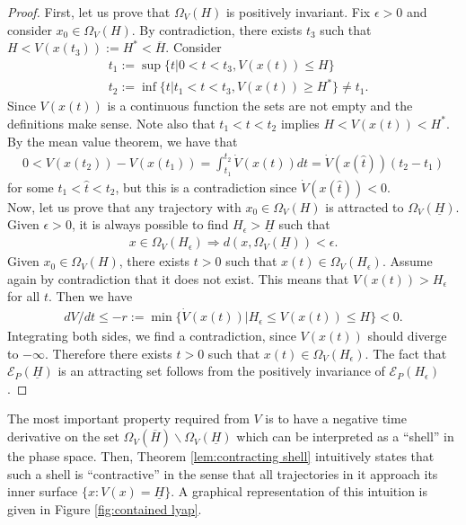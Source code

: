 \documentclass[letterpaper,10pt,twocolumn,journal,final]{IEEEtran}
\newcommand{\eps}{\epsilon}
\newcommand{\ellips}{\mathcal{E}}
\begin{document}
\begin{proof}
	First, let us prove that $\Omega_V(H)$ is positively invariant.
	Fix $\eps>0$ and consider $x_0\in \Omega_V(H)$.
	By contradiction, there exists $t_3$ such that 
	$H<V(x(t_3)):=H^*<\overline H$.
	Consider
	\begin{align}
		& t_1:=\sup\{t|0<t<t_3, V(x(t))\leq H \}\\
		& t_2:=\inf\{t|t_1<t<t_3, V(x(t))\geq H^* \}\neq t_1.
	\end{align}
	Since $V(x(t))$ is a continuous function the sets are not empty and the definitions make sense. Note also that $t_1 < t < t_2$ implies
	$H<V(x(t))<H^*$.
	By the mean value theorem, we have that
	\begin{align}
		0<V(x(t_2))-V(x(t_1))=\int_{t_1}^{t_2}\dot V(x(t)) dt= \dot V(x(\hat t))(t_2-t_1)
	\end{align}
	for some $t_1< \hat t < t_2$, but this is a contradiction since $\dot V(x(\hat t))<0$.\\
	Now, let us prove that any trajectory with $x_0\in\Omega_V(H)$ is attracted to $\Omega_V(\underline H)$.
	Given $\eps>0$, it is always possible to find $H_{\eps}>\underline H$ such that
	\begin{align}
		x\in\Omega_V(H_\eps)\Rightarrow  d(x,\Omega_V(\underline H))<\eps.
	\end{align}
	Given $x_0\in\Omega_V(H)$, there exists $t>0$ such that $x(t)\in\Omega_V(H_\eps)$. Assume again by contradiction that it does not exist. This means that $V(x(t))> H_{\eps}$ for all $t$. Then we have
	\begin{align}
		dV/dt \leq -r := \min\{\dot V(x(t))| H_{\eps}\leq V(x(t)) \leq H\}<0.
	\end{align}
	Integrating both sides, we find a contradiction, since $V(x(t))$ should diverge to $-\infty$. Therefore there exists $t>0$ such that $x(t)\in\Omega_V(H_\eps)$. The fact that $\ellips_P(\underline H)$ is an attracting set follows from the positively invariance of $\ellips_P(H_{\eps})$.
\end{proof}
The most important property required from $V$ is to have a negative time derivative on the set $\Omega_V(\overline H)\backslash \Omega_V(\underline H)$ which can be interpreted as a ``shell'' in the phase space. Then, Theorem \ref{lem:contracting shell} intuitively states that such a shell is ``contractive'' in the sense that all trajectories in it approach its inner surface $\{x: V(x)=\underline{H}\}$.
A graphical representation of this intuition is given in Figure \ref{fig:contained lyap}.
\end{document}
